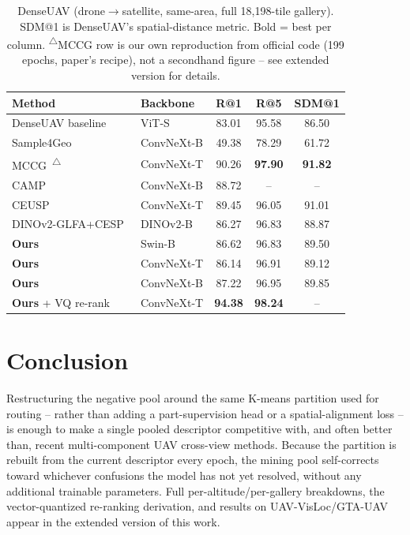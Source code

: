 \documentclass[conference]{IEEEtran}
\begin{document}
\begin{table}[t]
\caption{DenseUAV (drone$\to$satellite, same-area, full 18{,}198-tile
gallery). SDM@1 is DenseUAV's spatial-distance metric. Bold = best per
column. \textsuperscript{$\triangle$}MCCG row is our own reproduction from
official code (199 epochs, paper's recipe), not a secondhand figure -- see
extended version for details.}
\label{tab:soa_denseuav}
\centering
\footnotesize
\setlength{\tabcolsep}{3pt}
\begin{tabular}{l l ccc}
\toprule
Method & Backbone & R@1 & R@5 & SDM@1 \\
\midrule
DenseUAV baseline~\cite{dai2024denseuav} & ViT-S      & 83.01 & 95.58 & 86.50 \\
Sample4Geo~\cite{deuser2023sample4geo}   & ConvNeXt-B & 49.38 & 78.29 & 61.72 \\
MCCG~\cite{shen2024mccg}\textsuperscript{$\triangle$} & ConvNeXt-T & 90.26 & \textbf{97.90} & \textbf{91.82} \\
CAMP~\cite{wu2024camp}                   & ConvNeXt-B & 88.72 & --    & --    \\
CEUSP~\cite{xu2025ceusp}                 & ConvNeXt-T & 89.45 & 96.05 & 91.01 \\
DINOv2-GLFA+CESP~\cite{yang2025dinov2}    & DINOv2-B   & 86.27 & 96.83 & 88.87 \\
\midrule
\textbf{Ours}              & Swin-B     & 86.62 & 96.83 & 89.50 \\
\textbf{Ours}              & ConvNeXt-T & 86.14 & 96.91 & 89.12 \\
\textbf{Ours}              & ConvNeXt-B & 87.22 & 96.95 & 89.85 \\
\textbf{Ours} + VQ re-rank & ConvNeXt-T & \textbf{94.38} & \textbf{98.24} & -- \\
\bottomrule
\end{tabular}
\end{table}

\section{Conclusion}
Restructuring the negative pool around the same K-means partition used
for routing -- rather than adding a part-supervision head or a
spatial-alignment loss -- is enough to make a single pooled descriptor
competitive with, and often better than, recent multi-component UAV
cross-view methods. Because the partition is rebuilt from the current
descriptor every epoch, the mining pool self-corrects toward whichever
confusions the model has not yet resolved, without any additional
trainable parameters. Full per-altitude/per-gallery breakdowns, the
vector-quantized re-ranking derivation, and results on UAV-VisLoc/GTA-UAV
appear in the extended version of this work.
\end{document}
